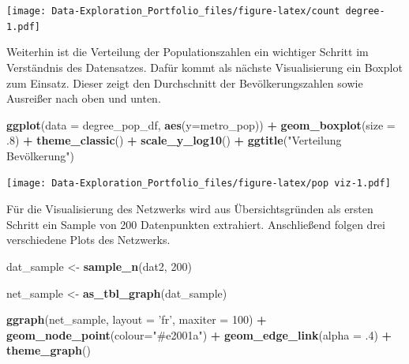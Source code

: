 \documentclass[]{article}
\newenvironment{Shaded}{\begin{snugshade}}{\end{snugshade}}
\newcommand{\DataTypeTok}[1]{\textcolor[rgb]{0.13,0.29,0.53}{#1}}
\newcommand{\DecValTok}[1]{\textcolor[rgb]{0.00,0.00,0.81}{#1}}
\newcommand{\FloatTok}[1]{\textcolor[rgb]{0.00,0.00,0.81}{#1}}
\newcommand{\KeywordTok}[1]{\textcolor[rgb]{0.13,0.29,0.53}{\textbf{#1}}}
\newcommand{\NormalTok}[1]{#1}
\newcommand{\OperatorTok}[1]{\textcolor[rgb]{0.81,0.36,0.00}{\textbf{#1}}}
\newcommand{\StringTok}[1]{\textcolor[rgb]{0.31,0.60,0.02}{#1}}
\begin{document}
\texttt{[image: Data-Exploration\_Portfolio\_files/figure-latex/count degree-1.pdf]}

Weiterhin ist die Verteilung der Populationszahlen ein wichtiger Schritt
im Verständnis des Datensatzes. Dafür kommt als nächste Visualisierung
ein Boxplot zum Einsatz. Dieser zeigt den Durchschnitt der
Bevölkerungszahlen sowie Ausreißer nach oben und unten.

\begin{Shaded}
\begin{Highlighting}[]
\KeywordTok{ggplot}\NormalTok{(}\DataTypeTok{data =}\NormalTok{ degree_pop_df, }\KeywordTok{aes}\NormalTok{(}\DataTypeTok{y=}\NormalTok{metro_pop)) }\OperatorTok{+}
\StringTok{  }\KeywordTok{geom_boxplot}\NormalTok{(}\DataTypeTok{size =} \FloatTok{.8}\NormalTok{) }\OperatorTok{+}
\StringTok{  }\KeywordTok{theme_classic}\NormalTok{() }\OperatorTok{+}
\StringTok{  }\KeywordTok{scale_y_log10}\NormalTok{() }\OperatorTok{+}
\StringTok{  }\KeywordTok{ggtitle}\NormalTok{(}\StringTok{"Verteilung Bevölkerung"}\NormalTok{)}
\end{Highlighting}
\end{Shaded}

\texttt{[image: Data-Exploration\_Portfolio\_files/figure-latex/pop viz-1.pdf]}

Für die Visualisierung des Netzwerks wird aus Übersichtsgründen als
ersten Schritt ein Sample von 200 Datenpunkten extrahiert. Anschließend
folgen drei verschiedene Plots des Netzwerks.

\begin{Shaded}
\begin{Highlighting}[]
\NormalTok{dat_sample <-}\StringTok{ }\KeywordTok{sample_n}\NormalTok{(dat2, }\DecValTok{200}\NormalTok{)}

\NormalTok{net_sample <-}\StringTok{ }\KeywordTok{as_tbl_graph}\NormalTok{(dat_sample)}

\KeywordTok{ggraph}\NormalTok{(net_sample, }\DataTypeTok{layout =} \StringTok{'fr'}\NormalTok{, }\DataTypeTok{maxiter =} \DecValTok{100}\NormalTok{) }\OperatorTok{+}\StringTok{ }
\StringTok{  }\KeywordTok{geom_node_point}\NormalTok{(}\DataTypeTok{colour=}\StringTok{"#e2001a"}\NormalTok{) }\OperatorTok{+}\StringTok{ }
\StringTok{  }\KeywordTok{geom_edge_link}\NormalTok{(}\DataTypeTok{alpha =} \FloatTok{.4}\NormalTok{) }\OperatorTok{+}
\StringTok{  }\KeywordTok{theme_graph}\NormalTok{()}
\end{Highlighting}
\end{Shaded}
\end{document}
